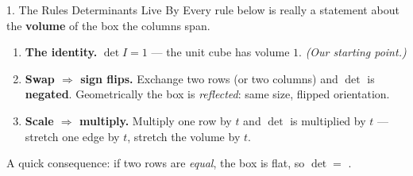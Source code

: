 \documentclass[10pt]{article}
\begin{document}
\begin{notesbox}{1. The Rules Determinants Live By}
Every rule below is really a statement about the \textbf{volume} of the box the columns span.
\begin{enumerate}[leftmargin=1.5em, itemsep=3pt]
  \item \textbf{The identity.} $\det I=1$ --- the unit cube has volume $1$. \emph{(Our starting point.)}
  \item \textbf{Swap $\Rightarrow$ sign flips.} Exchange two rows (or two columns) and $\det$ is
        \textbf{negated}. Geometrically the box is \emph{reflected}: same size, flipped orientation.
  \item \textbf{Scale $\Rightarrow$ multiply.} Multiply one row by $t$ and $\det$ is multiplied by $t$
        --- stretch one edge by $t$, stretch the volume by $t$.
\end{enumerate}
A quick consequence: if two rows are \emph{equal}, the box is flat, so $\det=$ .
\end{notesbox}
\end{document}
